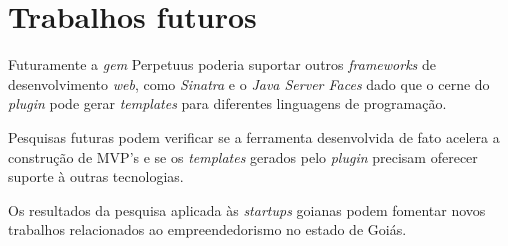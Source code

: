 \section{Trabalhos futuros}

Futuramente a \emph{gem} Perpetuus poderia suportar outros \emph{frameworks} de desenvolvimento \emph{web}, como \emph{Sinatra} e o \emph{Java Server Faces} dado que o cerne do \emph{plugin} pode gerar \emph{templates} para diferentes linguagens de programa\c{c}\~ao.

Pesquisas futuras podem verificar se a ferramenta desenvolvida de fato acelera a constru\c{c}\~ao de MVP's e se os \emph{templates} gerados pelo \emph{plugin} precisam oferecer suporte \`a outras tecnologias.

Os resultados da pesquisa aplicada \`as \emph{startups} goianas podem fomentar novos trabalhos relacionados ao empreendedorismo no estado de Goi\'as.
